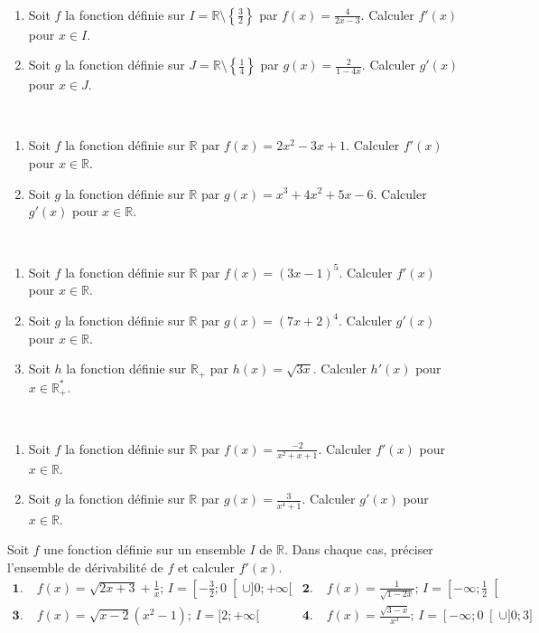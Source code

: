 \documentclass[11pt]{article}
\begin{document}
\begin{exo}~
\begin{enumerate}
  \item Soit $f$ la fonction définie sur $I=\mathbb{R}\setminus\left\{
      \frac{3}{2}\right\}$ par $f(x)=\frac{4}{2x-3}$. Calculer $f'(x)$ pour
      $x\in I$.
  \item Soit $g$ la fonction définie sur $J=\mathbb{R}\setminus\left\{
      \frac{1}{4}\right\}$ par $g(x)=\frac{2}{1-4x}$. Calculer $g'(x)$ pour
      $x\in J$.
\end{enumerate}
\end{exo}

\begin{exo}~
\begin{enumerate}
  \item Soit $f$ la fonction définie sur $\mathbb{R}$ par $f(x)=2x^2-3x+1$.
    Calculer $f'(x)$ pour $x\in\mathbb{R}$.
  \item Soit $g$ la fonction définie sur $\mathbb{R}$ par $g(x)=x^3+4x^2+5x-6$.
    Calculer $g'(x)$ pour $x\in\mathbb{R}$.
\end{enumerate}
\end{exo}

\begin{exo}~
\begin{enumerate}
  \item Soit $f$ la fonction définie sur $\mathbb{R}$ par $f(x)=(3x-1)^5$.
    Calculer $f'(x)$ pour $x\in\mathbb{R}$.
  \item Soit $g$ la fonction définie sur $\mathbb{R}$ par $g(x)=(7x+2)^4$.
    Calculer $g'(x)$ pour $x\in\mathbb{R}$.
  \item Soit $h$ la fonction définie sur $\mathbb{R_+}$ par
    $h(x)=\sqrt{3x}$.
    Calculer $h'(x)$ pour $x\in\mathbb{R_+^*}$.
\end{enumerate}
\end{exo}

\begin{exo}~
\begin{enumerate}
  \item Soit $f$ la fonction définie sur $\mathbb{R}$ par
    $f(x)=\frac{-2}{x^2+x+1}$. Calculer $f'(x)$ pour $x\in\mathbb{R}$.
  \item Soit $g$ la fonction définie sur $\mathbb{R}$ par
    $g(x)=\frac{3}{x^4+1}$. Calculer $g'(x)$ pour $x\in\mathbb{R}$.
\end{enumerate}
\end{exo}

\begin{exo}
Soit $f$ une fonction définie sur un ensemble $I$ de $\mathbb{R}$. Dans chaque
cas, préciser l'ensemble de dérivabilité de $f$ et calculer $f'(x)$.
\begin{align*}
  \textbf{1.}\;&
  f(x)=\sqrt{2x+3}+\frac{1}{x};\,I=\left[-\frac{3}{2};0\right[\cup]0;+\infty[ &
  \textbf{2.}\;& f(x)=\frac{1}{\sqrt{1-2x}};\,I=\left[-\infty;\frac{1}{2}\right[
    \\
  \textbf{3.}\;& f(x)=\sqrt{x-2}(x^2-1);\, I=[2;+\infty[ &
  \textbf{4.}\;& f(x)=\frac{\sqrt{3-x}}{x^3};\, I=\left[-\infty;0\right[\cup]0;3]
\end{align*}
\end{exo}
\end{document}
